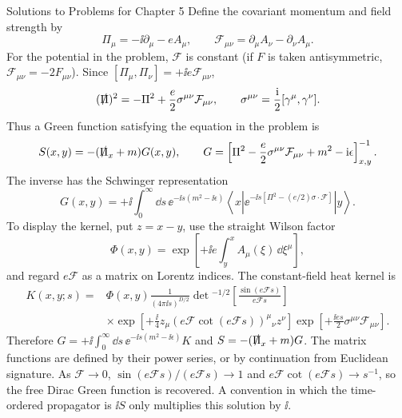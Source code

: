\begin{bankssolutions}{Solutions to Problems for Chapter 5}
Define the covariant momentum and field strength by
\begin{equation*}
 \Pi_\mu=-\ii\partial_\mu-eA_\mu,
 \qquad
 \mathcal F_{\mu\nu}=\partial_\mu A_\nu-\partial_\nu A_\mu.
\end{equation*}
For the potential in the problem, $\mathcal F$ is constant (if $F$ is taken
antisymmetric, $\mathcal F_{\mu\nu}=-2F_{\mu\nu}$). Since
$[\Pi_\mu,\Pi_\nu]=+\ii e\mathcal F_{\mu\nu}$,
\begin{equation*}
 (\slashed\Pi)^2=-\Pi^2+\frac e2\sigma^{\mu\nu}\mathcal F_{\mu\nu},
 \qquad \sigma^{\mu\nu}=\frac{\mathrm{i}}2[\gamma^\mu,\gamma^\nu].
\end{equation*}
Thus a Green function satisfying the equation in the problem is
\begin{equation*}
 S(x,y)=-(\slashed\Pi_x+m)G(x,y),
 \qquad
 G=\left[\Pi^2-\frac e2\sigma^{\mu\nu}\mathcal F_{\mu\nu}+m^2-\mathrm{i}\epsilon\right]^{-1}_{x,y}.
\end{equation*}
The inverse has the Schwinger representation
\begin{equation*}
 G(x,y)=+\ii\int_0^\infty\dd s\,
 \ee^{-\ii s(m^2-\ii\epsilon)}
 \left\langle x\left|\ee^{-\ii s[\Pi^2-(e/2)\sigma\cdot\mathcal F]}\right|y\right\rangle.
\end{equation*}
To display the kernel, put $z=x-y$, use the straight Wilson factor
\begin{equation*}
 \Phi(x,y)=\exp\!\left[+\ii e\int_y^x A_\mu(\xi)\,\dd\xi^\mu\right],
\end{equation*}
and regard $e\mathcal F$ as a matrix on Lorentz indices. The constant-field
heat kernel is
\begin{align*}
 K(x,y;s)={}&\Phi(x,y)\frac{1}{(4\pi\ii s)^{D/2}}
 \det{}^{-1/2}\!\left[\frac{\sin(e\mathcal F s)}{e\mathcal F s}\right]\\
 &\times\exp\!\left[+\frac\ii4 z_\mu
   (e\mathcal F\cot(e\mathcal F s))^{\mu}{}_{\nu}z^\nu\right]
 \exp\!\left[+\frac{\ii e s}{2}\sigma^{\mu\nu}\mathcal F_{\mu\nu}\right].
\end{align*}
Therefore $G=+\ii\int_0^\infty\dd s\,\ee^{-\ii s(m^2-\ii\epsilon)}K$ and
$S=-(\slashed\Pi_x+m)G$. The matrix functions are defined by their power
series, or by continuation from Euclidean signature. As $\mathcal F\to0$,
$\sin(e\mathcal F s)/(e\mathcal F s)\to1$ and
$e\mathcal F\cot(e\mathcal F s)\to s^{-1}$, so the free Dirac Green function
is recovered. A convention in which the time-ordered propagator is
$\ii S$ only multiplies this solution by $\ii$.


\end{bankssolutions}
